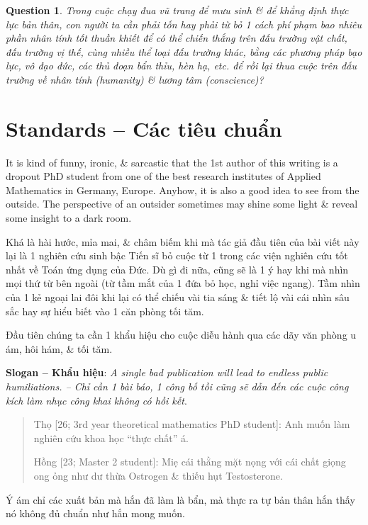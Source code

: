 \documentclass[12pt,twoside]{book}
\newtheorem{question}{Question}
\begin{document}
\begin{question}
	Trong cuộc chạy đua vũ trang để mưu sinh \& để khẳng định thực lực bản thân, con người ta cần phải tốn hay phải từ bỏ 1 cách phí phạm bao nhiêu phần nhân tính tốt thuần khiết để có thể chiến thắng trên đấu trường vật chất, đấu trường vị thế, cùng nhiều thể loại đấu trường khác, bằng các phương pháp bạo lực, vô đạo đức, các thủ đoạn bẩn thỉu, hèn hạ, etc. để rồi lại thua cuộc trên đấu trường về nhân tính (humanity) \& lương tâm (conscience)?
\end{question}

\section{Standards -- Các tiêu chuẩn}
It is kind of funny, ironic, \& sarcastic that the 1st author of this writing is a dropout PhD student from one of the best research institutes of Applied Mathematics in Germany, Europe. Anyhow, it is also a good idea to see from the outside. The perspective of an outsider sometimes may shine some light \& reveal some insight to a dark room.

Khá là hài hước, mỉa mai, \& châm biếm khi mà tác giả đầu tiên của bài viết này lại là 1 nghiên cứu sinh bậc Tiến sĩ bỏ cuộc từ 1 trong các viện nghiên cứu tốt nhất về Toán ứng dụng của Đức. Dù gì đi nữa, cũng sẽ là 1 ý hay khi mà nhìn mọi thứ từ bên ngoài (từ tầm mắt của 1 đứa bỏ học, nghỉ việc ngang). Tầm nhìn của 1 kẻ ngoại lai đôi khi lại có thể chiếu vài tia sáng \& tiết lộ vài cái nhìn sâu sắc hay sự hiểu biết vào 1 căn phòng tối tăm.

Đầu tiên chúng ta cần 1 khẩu hiệu cho cuộc diễu hành qua các dãy văn phòng u ám, hôi hám, \& tối tăm.

\vspace{2mm}
\noindent\textsf{{\bf Slogan -- Khẩu hiệu}}: {\it A single bad publication will lead to endless public humiliations. -- Chỉ cần 1 bài báo, 1 công bố tồi cũng sẽ dẫn đến các cuộc công kích làm nhục công khai không có hồi kết}.

\begin{quote}
	{\sf Thọ [26; 3rd year theoretical mathematics PhD student]}: Anh muốn làm nghiên cứu khoa học ``thực chất'' á.
	
	{\sf Hồng [23; Master 2 student]}: Miẹ cái thằng mặt nọng với cái chất giọng ong ỏng như dư thừa Ostrogen \& thiếu hụt Testosterone.
\end{quote}
Ý ám chỉ các xuất bản mà hắn đã làm là bẩn, mà thực ra tự bản thân hắn thấy nó không đủ chuẩn như hắn mong muốn.
\end{document}
